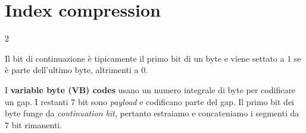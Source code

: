 \documentclass[\main/main.tex]{subfiles}
\begin{document}
\chapter{Index compression}
\begin{multicols}{2}
\begin{definition}
    Il bit di continuazione è tipicamente il primo bit di un byte e viene settato a \(1\) se è parte dell'ultimo byte, altrimenti a \(0\).
\end{definition}
\begin{definition}
    I \textbf{variable byte (VB) codes} usano un numero integrale di byte per codificare un gap. I restanti 7 bit sono \textit{payload} e codificano parte del gap. Il primo bit dei byte funge da \textit{continuation bit}, pertanto estraiamo e concateniamo i segmenti da \(7\) bit rimanenti.
\end{definition}
\end{multicols}
\end{document}
